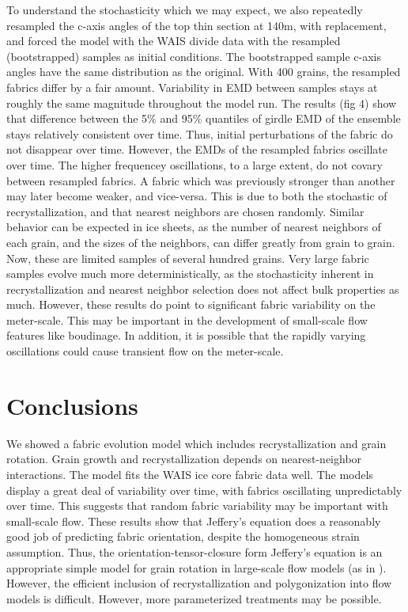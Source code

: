 \documentclass{igs}
\begin{document}
To understand the stochasticity which we may expect, we also repeatedly resampled the c-axis angles of the top thin section at 140m, with replacement, and forced the model with the WAIS divide data with the resampled (bootstrapped) samples as initial conditions. The bootstrapped sample c-axis angles have the same distribution as the original. With 400 grains, the resampled fabrics differ by a fair amount. Variability in EMD between samples stays at roughly the same magnitude throughout the model run. The results (fig 4) show that difference between the 5\% and 95\% quantiles of girdle EMD of the ensemble stays relatively consistent over time. Thus, initial perturbations of the fabric do not disappear over time.  However, the EMDs of the resampled fabrics oscillate over time. The higher frequencey oscillations, to a large extent, do not covary between resampled fabrics. A fabric which was previously stronger than another may later become weaker, and vice-versa. This is due to both the stochastic of recrystallization, and that nearest neighbors are chosen randomly. Similar behavior can be expected in ice sheets, as the number of nearest neighbors of each grain, and the sizes of the neighbors, can differ greatly from grain to grain. Now, these are limited samples of several hundred grains. Very large fabric samples evolve much more deterministically, as the stochasticity inherent in recrystallization and nearest neighbor selection does not affect bulk properties as much. However, these results do point to significant fabric variability on the meter-scale. This may be important in the development of small-scale flow features like boudinage. In addition, it is possible that the rapidly varying oscillations could cause transient flow on the meter-scale. 

\section{Conclusions}
We showed a fabric evolution model which includes recrystallization and grain rotation. Grain growth and recrystallization depends on nearest-neighbor interactions. The model fits the WAIS ice core fabric data well. The models display a great deal of variability over time, with fabrics oscillating unpredictably over time. This suggests that random fabric variability may be important with small-scale flow. These results show that Jeffery's equation does a reasonably good job of predicting fabric orientation, despite the homogeneous strain assumption. Thus, the orientation-tensor-closure form  Jeffery's equation is an appropriate simple model for grain rotation in large-scale flow models (as in \citet{gillet2006}). However, the efficient inclusion of recrystallization and polygonization into flow models is difficult. However, more parameterized treatments may be possible.
\end{document}
